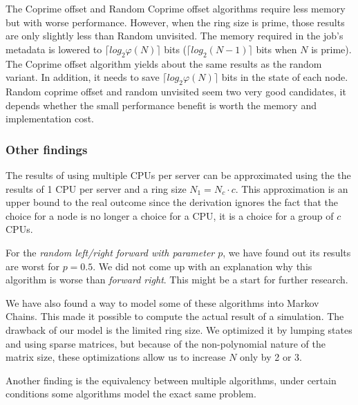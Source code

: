 \documentclass[10pt,a4paper]{article}
\newcommand{\FR}{\textit{forward right\xspace}}
\newcommand{\RLRF}[1]{\textit{random left/right forward with parameter #1\xspace}}
\begin{document}
The Coprime offset and Random Coprime offset algorithms require less memory but with worse performance. However, when the ring size is prime, those results are only slightly less than Random unvisited. The memory required in the job's metadata is lowered to $\lceil log_2 \varphi(N) \rceil$ bits ($\lceil log_2 (N-1) \rceil$ bits when $N$ is prime). The Coprime offset algorithm yields about the same results as the random variant. In addition, it needs to save $\lceil log_2 \varphi(N) \rceil$ bits in the state of each node. Random coprime offset and random unvisited seem two very good candidates, it depends whether the small performance benefit is worth the memory and implementation cost.

\subsubsection{Other findings}
The results of using multiple CPUs per server can be approximated using the the results of 1 CPU per server and a ring size $N_1 = N_c \cdot c$. This approximation is an upper bound to the real outcome since the derivation ignores the fact that the choice for a node is no longer a choice for a CPU, it is a choice for a group of $c$ CPUs. 

For the \RLRF{$p$}, we have found out its results are worst for $p=0.5$. We did not come up with an explanation why this algorithm is worse than \FR. This might be a start for further research.

We have also found a way to model some of these algorithms into Markov Chains. This made it possible to compute the actual result of a simulation. The drawback of our model is the limited ring size. We optimized it by lumping states and using sparse matrices, but because of the non-polynomial nature of the matrix size, these optimizations allow us to increase $N$ only by 2 or 3.

Another finding is the equivalency between multiple algorithms, under certain conditions some algorithms model the exact same problem.
\end{document}
